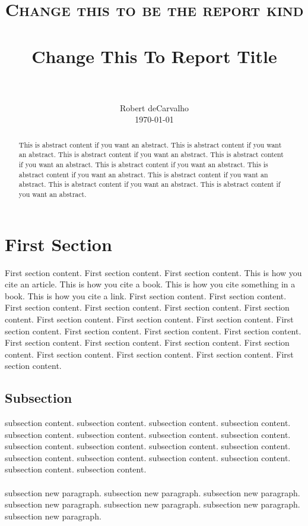 \documentclass[paper=a4, fontsize=11pt abstract]{scrartcl}
\title{
		\usefont{OT1}{bch}{b}{n}
		\normalfont \normalsize \textsc{Change this to be the report kind} \\ [25pt]
		\horrule{0.5pt} \\[0.4cm]
		\huge Change This To Report Title \\
		\horrule{2pt} \\[0.5cm]
}
\author{
		\normalfont 								\normalsize
        Robert deCarvalho\\[-3pt]		\normalsize
        \today
}
\date{}
\numberwithin{equation}{section}		%
\numberwithin{figure}{section}			%
\numberwithin{table}{section}				%
\begin{document}
\maketitle


\begin{abstract}
This is abstract content if you want an abstract.
This is abstract content if you want an abstract.
This is abstract content if you want an abstract.
This is abstract content if you want an abstract.
This is abstract content if you want an abstract.
This is abstract content if you want an abstract.
This is abstract content if you want an abstract.
This is abstract content if you want an abstract.
This is abstract content if you want an abstract.
\end{abstract}

\section{First Section}
First section content. First section content. First section content.
This is how you cite\cite{einstein} an article.
This is how you cite\cite{dirac} a book.
This is how you cite\cite{knuth-fa} something in a book.
This is how you cite\cite{knuthwebsite} a link.
First section content. First section content. First section content.
First section content. First section content. First section content.
First section content. First section content. First section content.
First section content. First section content. First section content.
First section content. First section content. First section content.
First section content. First section content. First section content.
First section content. First section content. First section content.

\subsection{Subsection}
subsection content. subsection content. subsection content. 
subsection content. subsection content. subsection content. 
subsection content. subsection content. subsection content. 
subsection content. subsection content. subsection content. 
subsection content. subsection content. subsection content. 
subsection content. subsection content. subsection content. 

\paragraph{}
subsection new paragraph. subsection new paragraph. subsection new paragraph. subsection new paragraph. subsection new paragraph. subsection new paragraph. subsection new paragraph.
\end{document}
